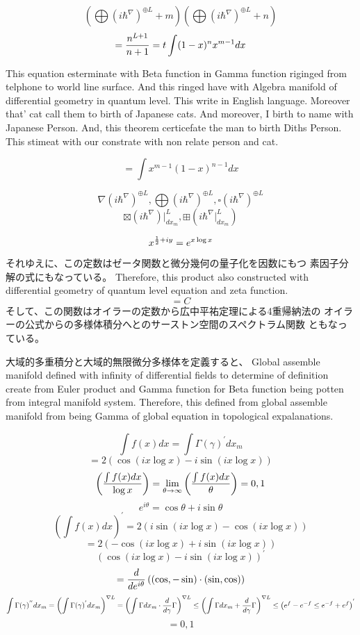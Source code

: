 \documentclass{jsarticle}
\begin{document}
   $$ \left(\bigoplus({i \hbar^{\nabla}})^{\oplus L}+m\right) 
   \left(\bigoplus({i \hbar^{\nabla}})^{\oplus L}+n\right) $$
  $$ = {n^{L+1} \over {n+1}} = t \int (1 - x)^n x^{m - 1} dx $$



     This equation esterminate with Beta function in Gamma function riginged from telphone
  to world line surface. And this ringed have with Algebra manifold of differential geometry in
  quantum level. This write in English language. Moreover that' cat call them to birth of Japanese cats.
  And moreover, I birth to name with Japanese Person. 
  And, this theorem certicefate the man to birth Diths Person.
  This stimeat with our constrate with non relate person and cat.


  $$ = \int x^{m-1}(1 - x)^{n-1} dx $$


  $$ \nabla ({i \hbar^{\nabla}})^{\oplus L}, \bigoplus ({i \hbar^{\nabla}})^{
	   \oplus L}, \square ({i \hbar^{\nabla}})^{\oplus L} $$
   $$ \boxtimes (i \hbar^{\nabla})|_{dx_m}^L, \boxplus (i \hbar^{\nabla}|_
   {dx_m}^L) $$



  $$ x^{{1 \over 2} + iy} = e^{x \log x} $$
  それゆえに、この定数はゼータ関数と微分幾何の量子化を因数にもつ
  素因子分解の式にもなっている。
  Therefore, this product also constructed with differential geometry
  of quantum level equation and zeta function.
  $$ = C $$ 
  そして、この関数はオイラーの定数から広中平祐定理による4重帰納法の
  オイラーの公式からの多様体積分へとのサーストン空間のスペクトラム関数
  ともなっている。
  

       大域的多重積分と大域的無限微分多様体を定義すると、
   Global assemble manifold defined with infinity of differential
   fields to determine of definition create from Euler product and
   Gamma function for Beta function being potten from integral manifold
   system. Therefore, this defined from global assemble manifold from
   being Gamma of global equation in topological expalanations.

   $$ \int f(x)dx = \int \Gamma(\gamma)^{'}dx_m $$
   $$ = 2 (\cos (i x \log x) - i \sin(i x \log x)) $$
   $$ \left({{\int f(x) dx} \over \log x}\right) = \lim_{\theta \to \infty}
    \left({{\int f(x) dx} \over \theta}\right) = 0,1 $$
    $$ e^{i \theta} = \cos \theta + i \sin \theta $$
    $$ \left({\int f(x) dx}\right)^{'} = 2 (i \sin(i x \log x) - \cos (i x \log
    x)) $$
    $$ = 2(- \cos(i x \log x) + i \sin(i x \log x)) $$
    $$ (\cos (i x \log x) - i \sin(i x \log x))^{'} $$
    $$ = {d \over {d {e^{i\theta}}}}\left((\cos, - \sin )\cdot
    (\sin, \cos)\right)  $$
    $$ \int \Gamma(\gamma)^{''}dx_m = \left({\int \Gamma(\gamma)^{'}}dx_m
    \right)^{\nabla L} = \left({{\int \Gamma dx_m} \cdot {{d \over d\gamma}
    \Gamma}}\right)^{\nabla L} \le 
    \left({\int \Gamma dx_m + {d \over d\gamma}\Gamma}\right)^{\nabla L} \le 
    \left({e^{f} - e^{-f}} \le {e^{-f} + e^{f}}\right)^{'}  $$
    $$ = 0,1 $$
\end{document}
